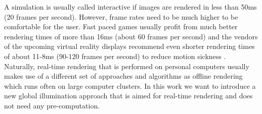 \documentclass[thesis.tex]{subfiles}
\begin{document}
A simulation is usually called interactive if images are rendered in less than 50ms (20 frames per second).
However, frame rates need to be much higher to be comfortable for the user.
Fast paced games usually profit from much better rendering times of more than 16ms (about 60 frames per second) \cite{bib:shooterfps} and the vendors of the upcoming virtual reality displays recommend even shorter rendering times of about 11-8ms (90-120 frames per second) to reduce motion sickness \cite{bib:oculushighfps}.
Naturally, real-time rendering that is performed on personal computers usually makes use of a different set of approaches and algorithms as offline rendering which runs often on large computer clusters.
In this work we want to introduce a new global illumination approach that is aimed for real-time rendering and does not need any pre-computation.
\end{document}
